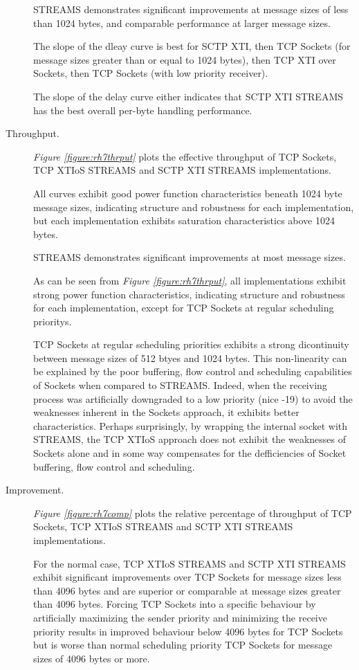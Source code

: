 \documentclass[letterpaper,final,notitlepage,twocolumn,10pt,twoside]{article}
\begin{document}
\begin{description}
STREAMS demonstrates significant improvements at message sizes of less than 1024 bytes, and
comparable performance at larger message sizes.

The slope of the dleay curve is best for SCTP XTI, then TCP Sockets (for message sizes greater than
or equal to 1024 bytes), then TCP XTI over Sockets, then TCP Sockets (with low priority receiver).

The slope of the delay curve either indicates that SCTP XTI STREAMS has the best overall per-byte
handling performance.

\item[Throughput.]

\textit{Figure \ref{figure:rh7thrput}}
plots the effective throughput of TCP Sockets, TCP XTIoS STREAMS and SCTP XTI STREAMS
implementations.

All curves exhibit good power function characteristics beneath 1024 byte message sizes, indicating
structure and robustness for each implementation, but each implementation exhibits saturation
characteristics above 1024 bytes.

STREAMS demonstrates significant improvements at most message sizes.

As can be seen from \textit{Figure \ref{figure:rh7thrput}}, all implementations exhibit strong power
function characteristics, indicating structure and robustness for each implementation, except for
TCP Sockets at regular scheduling prioritys.

TCP Sockets at regular scheduling priorities exhibits a strong dicontinuity between message sizes of
512 btyes and 1024 bytes.  This non-linearity can be explained by the poor buffering, flow control
and scheduling capabilities of Sockets when compared to STREAMS.  Indeed, when the receiving process
was artificially downgraded to a low priority (nice -19) to avoid the weaknesses inherent in the
Sockets approach, it exhibits better characteristics.  Perhaps surprisingly, by wrapping the
internal socket with STREAMS, the TCP XTIoS approach does not exhibit the weaknesses of Sockets
alone and in some way compensates for the defficiencies of Socket buffering, flow control and
scheduling.

\item[Improvement.]

\textit{Figure \ref{figure:rh7comp}}
plots the relative percentage of throughput of TCP Sockets, TCP XTIoS STREAMS and SCTP XTI STREAMS
implementations.

For the normal case, TCP XTIoS STREAMS and SCTP XTI STREAMS exhibit significant improvements over
TCP Sockets for message sizes less than 4096 bytes and are superior or comparable  at message sizes
greater than 4096 bytes.  Forcing TCP Sockets into a specific behaviour by artificially maximizing
the sender priority and minimizing the receive priority results in improved behaviour below 4096
bytes for TCP Sockets but is worse than normal scheduling priority TCP Sockets for message sizes of
4096 bytes or more.


\end{description}
\end{document}
